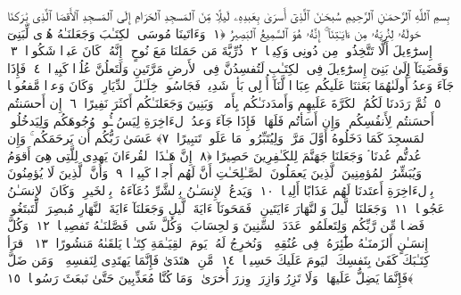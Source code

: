 
  
    
  
    
    

\nopagebreak
  بِسمِ ٱللَّهِ ٱلرَّحمَـٰنِ ٱلرَّحِيمِ
  سُبحَـٰنَ ٱلَّذِىٓ أَسرَىٰ بِعَبدِهِۦ لَيلًۭا مِّنَ ٱلمَسجِدِ ٱلحَرَامِ إِلَى ٱلمَسجِدِ ٱلأَقصَا ٱلَّذِى بَٰرَكنَا حَولَهُۥ لِنُرِيَهُۥ مِن ءَايَـٰتِنَآ ۚ إِنَّهُۥ هُوَ ٱلسَّمِيعُ ٱلبَصِيرُ ﴿١﴾
 وَءَاتَينَا مُوسَى ٱلكِتَـٰبَ وَجَعَلنَـٰهُ هُدًۭى لِّبَنِىٓ إِسرَٰٓءِيلَ أَلَّا تَتَّخِذُوا۟ مِن دُونِى وَكِيلًۭا ﴿٢﴾
 ذُرِّيَّةَ مَن حَمَلنَا مَعَ نُوحٍ ۚ إِنَّهُۥ كَانَ عَبدًۭا شَكُورًۭا ﴿٣﴾
 وَقَضَينَآ إِلَىٰ بَنِىٓ إِسرَٰٓءِيلَ فِى ٱلكِتَـٰبِ لَتُفسِدُنَّ فِى ٱلأَرضِ مَرَّتَينِ وَلَتَعلُنَّ عُلُوًّۭا كَبِيرًۭا ﴿٤﴾
 فَإِذَا جَآءَ وَعدُ أُولَىٰهُمَا بَعَثنَا عَلَيكُم عِبَادًۭا لَّنَآ أُو۟لِى بَأسٍۢ شَدِيدٍۢ فَجَاسُوا۟ خِلَـٰلَ ٱلدِّيَارِ ۚ وَكَانَ وَعدًۭا مَّفعُولًۭا ﴿٥﴾
 ثُمَّ رَدَدنَا لَكُمُ ٱلكَرَّةَ عَلَيهِم وَأَمدَدنَـٰكُم بِأَموَٟلٍۢ وَبَنِينَ وَجَعَلنَـٰكُم أَكثَرَ نَفِيرًا ﴿٦﴾
 إِن أَحسَنتُم أَحسَنتُم لِأَنفُسِكُم ۖ وَإِن أَسَأتُم فَلَهَا ۚ فَإِذَا جَآءَ وَعدُ ٱلءَاخِرَةِ لِيَسُۥٓـُٔوا۟ وُجُوهَكُم وَلِيَدخُلُوا۟ ٱلمَسجِدَ كَمَا دَخَلُوهُ أَوَّلَ مَرَّةٍۢ وَلِيُتَبِّرُوا۟ مَا عَلَوا۟ تَتبِيرًا ﴿٧﴾
 عَسَىٰ رَبُّكُم أَن يَرحَمَكُم ۚ وَإِن عُدتُّم عُدنَا ۘ وَجَعَلنَا جَهَنَّمَ لِلكَـٰفِرِينَ حَصِيرًا ﴿٨﴾
 إِنَّ هَـٰذَا ٱلقُرءَانَ يَهدِى لِلَّتِى هِىَ أَقوَمُ وَيُبَشِّرُ ٱلمُؤمِنِينَ ٱلَّذِينَ يَعمَلُونَ ٱلصَّـٰلِحَـٰتِ أَنَّ لَهُم أَجرًۭا كَبِيرًۭا ﴿٩﴾
 وَأَنَّ ٱلَّذِينَ لَا يُؤمِنُونَ بِٱلءَاخِرَةِ أَعتَدنَا لَهُم عَذَابًا أَلِيمًۭا ﴿١٠﴾
 وَيَدعُ ٱلإِنسَـٰنُ بِٱلشَّرِّ دُعَآءَهُۥ بِٱلخَيرِ ۖ وَكَانَ ٱلإِنسَـٰنُ عَجُولًۭا ﴿١١﴾
 وَجَعَلنَا ٱلَّيلَ وَٱلنَّهَارَ ءَايَتَينِ ۖ فَمَحَونَآ ءَايَةَ ٱلَّيلِ وَجَعَلنَآ ءَايَةَ ٱلنَّهَارِ مُبصِرَةًۭ لِّتَبتَغُوا۟ فَضلًۭا مِّن رَّبِّكُم وَلِتَعلَمُوا۟ عَدَدَ ٱلسِّنِينَ وَٱلحِسَابَ ۚ وَكُلَّ شَىءٍۢ فَصَّلنَـٰهُ تَفصِيلًۭا ﴿١٢﴾
 وَكُلَّ إِنسَـٰنٍ أَلزَمنَـٰهُ طَٰٓئِرَهُۥ فِى عُنُقِهِۦ ۖ وَنُخرِجُ لَهُۥ يَومَ ٱلقِيَـٰمَةِ كِتَـٰبًۭا يَلقَىٰهُ مَنشُورًا ﴿١٣﴾
 ٱقرَأ كِتَـٰبَكَ كَفَىٰ بِنَفسِكَ ٱليَومَ عَلَيكَ حَسِيبًۭا ﴿١٤﴾
 مَّنِ ٱهتَدَىٰ فَإِنَّمَا يَهتَدِى لِنَفسِهِۦ ۖ وَمَن ضَلَّ فَإِنَّمَا يَضِلُّ عَلَيهَا ۚ وَلَا تَزِرُ وَازِرَةٌۭ وِزرَ أُخرَىٰ ۗ وَمَا كُنَّا مُعَذِّبِينَ حَتَّىٰ نَبعَثَ رَسُولًۭا ﴿١٥﴾
